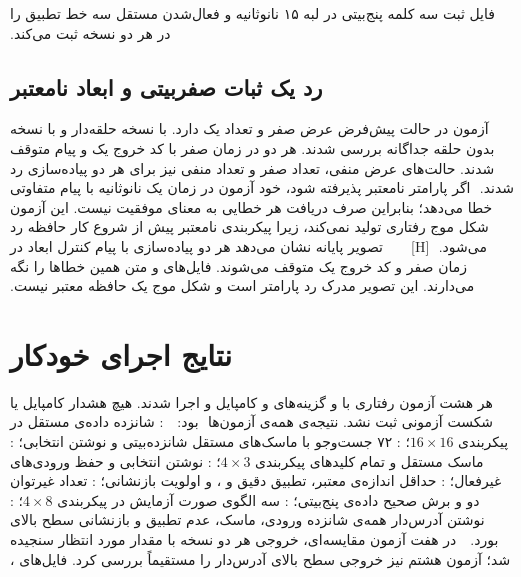 ‫
‫
‫
‫فایل  ثبت سه کلمه پنج‌بیتی در لبه ۱۵ نانوثانیه و فعال‌شدن مستقل سه خط تطبیق را در هر دو نسخه ثبت می‌کند.
‫
‫\subsection{رد یک ثبات صفر‌بیتی و ابعاد نامعتبر}
‫
‫آزمون  در حالت پیش‌فرض عرض صفر و تعداد یک دارد. با  نسخه حلقه‌دار و با  نسخه بدون حلقه جداگانه بررسی شدند. هر دو در زمان صفر با کد خروج یک و پیام  متوقف شدند. حالت‌های عرض منفی، تعداد صفر و تعداد منفی نیز برای هر دو پیاده‌سازی رد شدند.
‫
‫اگر پارامتر نامعتبر پذیرفته شود، خود آزمون در زمان یک نانوثانیه با پیام متفاوتی خطا می‌دهد؛ بنابراین صرف دریافت هر خطایی به معنای موفقیت نیست. این آزمون شکل موج رفتاری تولید نمی‌کند، زیرا پیکربندی نامعتبر پیش از شروع کار حافظه رد می‌شود.
‫
‫[H]
‫
‫
‫
‫
‫
‫تصویر پایانه نشان می‌دهد هر دو پیاده‌سازی با پیام کنترل ابعاد در زمان صفر و کد خروج یک متوقف می‌شوند. فایل‌های  و  متن همین خطاها را نگه می‌دارند. این تصویر مدرک رد پارامتر است و شکل موج یک حافظه معتبر نیست.
‫
‫\section{نتایج اجرای خودکار}
‫
‫هر هشت آزمون رفتاری با  و گزینه‌های  و 
‫کامپایل و اجرا شدند. هیچ هشدار کامپایل یا شکست آزمونی ثبت نشد. نتیجه‌ی همه‌ی آزمون‌ها
‫ بود:
‫
‫
‫ : شانزده داده‌ی مستقل در پیکربندی $16\times16$؛
‫ : ۷۲ جست‌وجو با ماسک‌های مستقل شانزده‌بیتی و نوشتن انتخابی؛
‫ : ماسک مستقل و تمام کلیدهای پیکربندی $4\times3$؛
‫ : نوشتن انتخابی و حفظ ورودی‌های غیرفعال؛
‫ : حداقل اندازه‌ی معتبر، تطبیق دقیق و ، و اولویت بازنشانی؛
‫ : تعداد غیرتوان دو و برش صحیح داده‌ی پنج‌بیتی؛
‫ : سه الگوی صورت آزمایش در پیکربندی $4\times8$؛
‫ : نوشتن آدرس‌دار همه‌ی شانزده ورودی، ماسک، عدم تطبیق و بازنشانی سطح بالای بورد.
‫
‫
‫در هفت آزمون مقایسه‌ای، خروجی هر دو نسخه با مقدار مورد انتظار سنجیده شد؛ آزمون هشتم نیز خروجی سطح بالای آدرس‌دار را مستقیماً بررسی کرد. فایل‌های ،

